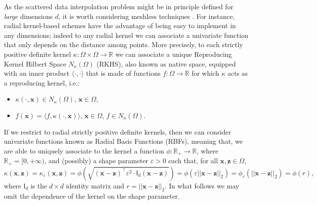 \documentclass[hyphens,a4paper,11pt]{article}
\newcommand{\mI}{\mathsf{I}}
\begin{document}
As the scattered data interpolation problem might be in principle defined for \emph{large} dimensions $d$, it is worth considering meshless techniques \cite{fasshauer2007meshfree,fasshauer2015kernel,wendland2005scattered}. For instance, radial kernel-based schemes have the advantage of being easy to implement in any dimensions; indeed to any radial kernel we can associate a univariate function that only depends on the distance among points. More precisely, to each strictly positive definite kernel $\kappa: \Omega \times  \Omega \longrightarrow \mathbb{R}$ we can associate a unique Reproducing Kernel Hilbert Space $N_{\kappa} (\Omega)$ (RKHS), also known as native space, equipped with an inner product $\langle \cdot, \cdot \rangle$ that is made of  functions $f:\Omega \rightarrow \mathbb{R}$ for which $\kappa$ acts as a reproducing kernel, i.e.: 
\begin{itemize}
    \item $\kappa(\cdot, \boldsymbol{x}) \in N_{\kappa}(\Omega)$,  $ \boldsymbol{x} \in \Omega$,
    \item $f(\boldsymbol{x})=\langle f, \kappa(\cdot,\boldsymbol{x}) \rangle$, $ \boldsymbol{x} \in \Omega$, $ f \in N_{\kappa}(\Omega)$.
\end{itemize}

If we restrict to radial strictly positive definite kernels, then we can consider univariate functions known as Radial Basis Functions (RBFs), meaning that, we are able to uniquely associate to the kernel a function $ \phi: \mathbb{R}_{+} \longrightarrow\mathbb{R}$, where $\mathbb{R}_{+}= [0,+\infty)$, and (possibly) a shape parameter $\varepsilon>0$ such that, for all $\boldsymbol{x},\boldsymbol{z}\in \Omega$, 
\begin{equation*} %
    \kappa(\boldsymbol{x},\boldsymbol{z})= \kappa_{\varepsilon}(\boldsymbol{x},\boldsymbol{z})=  \phi( \sqrt{(\boldsymbol{x}-\boldsymbol{z})^{\intercal} \varepsilon^2 \cdot \mI_d (\boldsymbol{x}-\boldsymbol{z})}) = \phi( \varepsilon ||\boldsymbol{x}-\boldsymbol{z}||_2) =\phi_{\varepsilon}( ||\boldsymbol{x}-\boldsymbol{z}||_2)=  \phi(r),
\end{equation*}
where $\mI_d$ is the $d \times d$ identity matrix and $r=||\boldsymbol{x}-\boldsymbol{z}||_2$. In what follows we may omit the dependence of the kernel on the shape parameter.  
\end{document}
